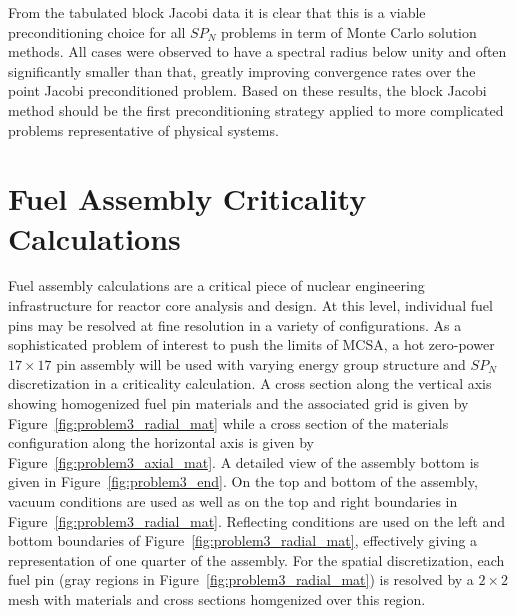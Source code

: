 From the tabulated block Jacobi data it is clear that this is a viable
preconditioning choice for all $SP_N$ problems in term of Monte Carlo
solution methods. All cases were observed to have a spectral radius
below unity and often significantly smaller than that, greatly
improving convergence rates over the point Jacobi preconditioned
problem. Based on these results, the block Jacobi method should be the
first preconditioning strategy applied to more complicated problems
representative of physical systems.
\clearpage

\section{Fuel Assembly Criticality Calculations}
\label{sec:fuel_assembly_calcs}
Fuel assembly calculations are a critical piece of nuclear engineering
infrastructure for reactor core analysis and design. At this level,
individual fuel pins may be resolved at fine resolution in a variety
of configurations. As a sophisticated problem of interest to push the
limits of MCSA, a hot zero-power $17 \times 17$ pin assembly will be
used with varying energy group structure and $SP_N$ discretization in
a criticality calculation. A cross section along the vertical axis
showing homogenized fuel pin materials and the associated grid is
given by Figure~\ref{fig:problem3_radial_mat} while a cross section of
the materials configuration along the horizontal axis is given by
Figure~\ref{fig:problem3_axial_mat}. A detailed view of the assembly
bottom is given in Figure~\ref{fig:problem3_end}. On the top and
bottom of the assembly, vacuum conditions are used as well as on the
top and right boundaries in
Figure~\ref{fig:problem3_radial_mat}. Reflecting conditions are used
on the left and bottom boundaries of
Figure~\ref{fig:problem3_radial_mat}, effectively giving a
representation of one quarter of the assembly. For the spatial
discretization, each fuel pin (gray regions in
Figure~\ref{fig:problem3_radial_mat}) is resolved by a $2 \times 2$
mesh with materials and cross sections homgenized over this region.
